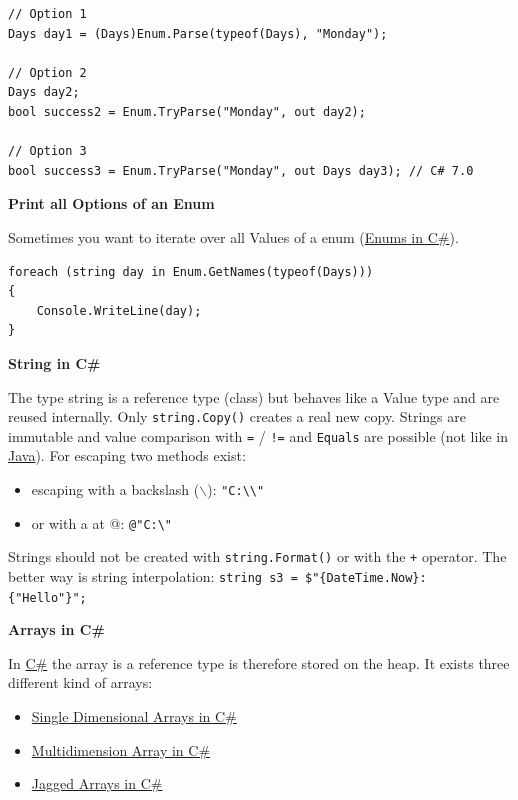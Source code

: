 \documentclass[11pt,twoside,landscape]{article}
\begin{document}
\begin{multicols}{3}
\lstset{language=csharp,label= ,caption= ,captionpos=b,numbers=none}
\begin{lstlisting}
// Option 1
Days day1 = (Days)Enum.Parse(typeof(Days), "Monday");

// Option 2
Days day2;
bool success2 = Enum.TryParse("Monday", out day2);

// Option 3
bool success3 = Enum.TryParse("Monday", out Days day3); // C# 7.0
\end{lstlisting}

\textbf{Print all Options of an Enum}

Sometimes you want to iterate over all Values of a enum (\href{../../../roam/20211006113326-enums_in_c.org}{Enums in C\#}).

\lstset{language=csharp,label= ,caption= ,captionpos=b,numbers=none}
\begin{lstlisting}
foreach (string day in Enum.GetNames(typeof(Days)))
{
    Console.WriteLine(day);
}
\end{lstlisting}

\textbf{String in C\#}

The type string is a reference type (class) but behaves like a Value type and are reused internally.
Only \texttt{string.Copy()} creates a real new copy.
Strings are immutable and value comparison with \texttt{=} / \texttt{!=} and \texttt{Equals} are possible (not like in \href{../../../roam/20201116150053-java.org}{Java}).
For escaping two methods exist:
\begin{itemize}
\item escaping with a backslash ($\backslash$): \texttt{"C:\textbackslash{}\textbackslash{}"}
\item or with a at @: \texttt{@"C:\textbackslash{}"}
\end{itemize}


Strings should not be created with \texttt{string.Format()} or with the \texttt{+} operator.
The better way is string interpolation: \texttt{string s3 = \$"\{DateTime.Now\}: \{"Hello"\}";}

\textbf{Arrays in C\#}

In \href{../../../roam/20211003114158-c.org}{C\#} the array is a reference type is therefore stored on the heap.
It exists three different kind of arrays:
\begin{itemize}
\item \href{../../../roam/20211008083138-single_dimensional_arrays_in_c.org}{Single Dimensional Arrays in C\#}
\item \href{../../../roam/20211008083241-multidimension_array_in_c.org}{Multidimension Array in C\#}
\item \href{../../../roam/20211008083300-jagged_arrays_in_c.org}{Jagged Arrays in C\#}
\end{itemize}



\end{multicols}
\end{document}

